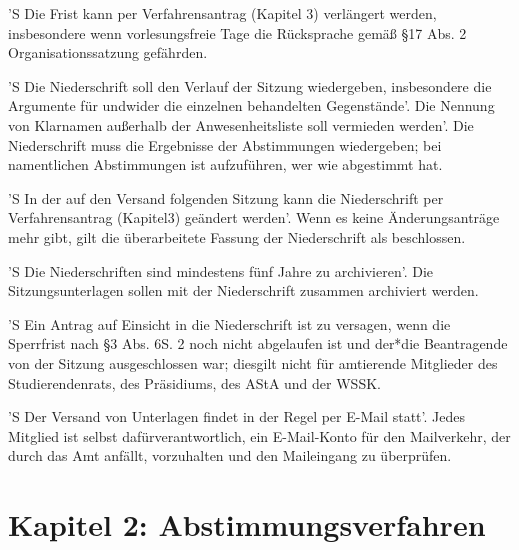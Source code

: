 \documentclass[fontsize=12pt,parskip=half, ref=short]{scrartcl}
\begin{document}
\begin{contract}
  'S Die Frist kann per Verfahrensantrag (Kapitel 3) verlängert werden,
  insbesondere wenn vorlesungsfreie Tage die Rücksprache gemäß §17 Abs. 2
  Organisationssatzung gefährden.

  \label{Par:Nieders}
  'S Die Niederschrift soll den Verlauf der Sitzung wiedergeben, insbesondere
  die Argumente für undwider die einzelnen behandelten Gegenstände'. Die Nennung
  von Klarnamen außerhalb der Anwesenheitsliste soll vermieden werden'. Die
  Niederschrift muss die Ergebnisse der Abstimmungen wiedergeben; bei
  namentlichen Abstimmungen ist aufzuführen, wer wie abgestimmt hat.

  'S In der auf den Versand folgenden Sitzung kann die Niederschrift per
  Verfahrensantrag (Kapitel3) geändert werden'. Wenn es keine Änderungsanträge
  mehr gibt, gilt die überarbeitete Fassung der Niederschrift als beschlossen.

  'S Die Niederschriften sind mindestens fünf Jahre zu archivieren'. Die
  Sitzungsunterlagen sollen mit der Niederschrift zusammen archiviert werden.

  'S Ein Antrag auf Einsicht in die Niederschrift ist zu versagen, wenn die
  Sperrfrist nach §3 Abs. 6S. 2 noch nicht abgelaufen ist und der*die
  Beantragende von der Sitzung ausgeschlossen war; diesgilt nicht für amtierende
  Mitglieder des Studierendenrats, des Präsidiums, des AStA und der WSSK.

  \label{Par:ElekMed}
  'S Der Versand von Unterlagen findet in der Regel per E-Mail statt'. Jedes
  Mitglied ist selbst dafürverantwortlich, ein E-Mail-Konto für den Mailverkehr,
  der durch das Amt anfällt, vorzuhalten und den Maileingang zu überprüfen.

\end{contract}

\section*{Kapitel 2: Abstimmungsverfahren}
\end{document}
